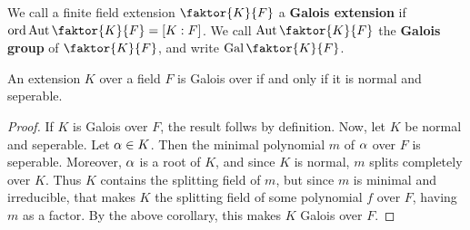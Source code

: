 \begin{definition}
    We call a finite field extension $\faktor{K}{F}$ a \textbf{Galois extension}
    if $\ord{\Aut{\faktor{K}{F}}}=[K:F]$. We call $\Aut{\faktor{K}{F}}$ the
    \textbf{Galois group} of $\faktor{K}{F}$, and write $\Gal{\faktor{K}{F}}$.
\end{definition}

\begin{lemma}\label{2.1.6}
    An extension $K$ over a field $F$ is Galois over if and only if it is normal
    and seperable.
\end{lemma}
\begin{proof}
    If $K$ is Galois over $F$, the result follws by definition. Now, let $K$ be
    normal and seperable. Let $\alpha \in K$. Then the minimal polynomial $m$ of
    $\alpha$ over $F$ is seperable. Moreover, $\alpha$ is a root of $K$, and since $K$
    is normal, $m$ splits completely over $K$. Thus $K$ contains the splitting
    field of $m$, but since $m$ is minimal and irreducible, that makes  $K$ the
    splitting field of some polynomial $f$ over $F$, having $m$ as a factor. By
    the above corollary, this makes $K$ Galois over  $F$.
\end{proof}


